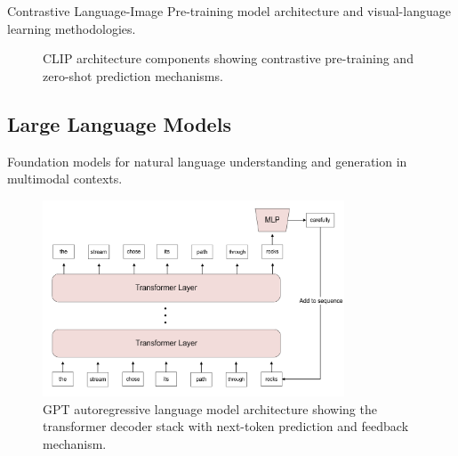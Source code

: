 Contrastive Language-Image Pre-training model architecture and visual-language learning methodologies.

\begin{figure}[htbp]
\centering
{}
\hfill
{}
\caption{CLIP architecture components showing contrastive pre-training and zero-shot prediction mechanisms.}
\label{fig:clip_architecture}
\end{figure}

\subsection{Large Language Models}

Foundation models for natural language understanding and generation in multimodal contexts.

\begin{figure}[htbp]
\centering
\includegraphics[width=0.8\textwidth]{Images/gpt.png}
\caption{GPT autoregressive language model architecture showing the transformer decoder stack with next-token prediction and feedback mechanism.}
\label{fig:gpt}
\end{figure}